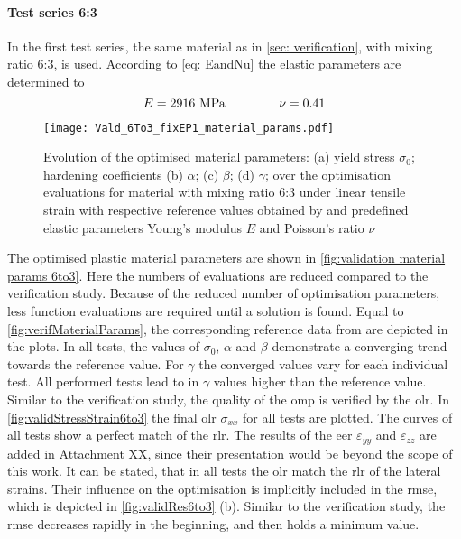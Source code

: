 \paragraph{Test series 6:3}
In the first test series, the same material as in \autoref{sec: verification}, with mixing ratio 6:3, is used. According to \autoref{eq: EandNu} the elastic parameters are determined to 
\begin{equation*}
    E = 2916 \text{MPa} \hspace{1.5cm} \nu = 0.41 
\end{equation*}

\begin{figure}[H]
    \centering
    \texttt{[image: Vald\_6To3\_fixEP1\_material\_params.pdf]}
    \caption{Evolution of the optimised material parameters: (a) yield stress $\sigma_0$; hardening coefficients (b) $\alpha$; (c) $\beta$; (d) $\gamma$; over the optimisation evaluations for material with mixing ratio 6:3 under linear tensile strain with respective reference values obtained by \citet{ries_deciphering_nodate} and predefined elastic parameters Young's modulus $E$ and Poisson's ratio $\nu$}
    \label{fig:validation material params 6to3}
\end{figure}

The optimised plastic material parameters are shown in \autoref{fig:validation material params 6to3}. Here the numbers of evaluations are reduced compared to the verification study. Because of the reduced number of optimisation parameters, less function evaluations are required until a solution is found.
Equal to \autoref{fig:verifMaterialParams}, the corresponding reference data from \citet{ries_deciphering_nodate} are depicted in the plots.
In all tests, the values of $\sigma_0$, $\alpha$ and $\beta$ demonstrate a converging trend towards the reference value.
For $\gamma$ the converged values vary for each individual test.
All performed tests lead to in $\gamma$ values higher than the reference value. Similar to the verification study, the quality of the \acrlong{omp} is verified by the \acrlong{olr}. In \autoref{fig:validStressStrain6to3} the final \acrlong{olr} $\sigma_{xx}$ for all tests are plotted. The curves of all tests show a perfect match of the \acrlong{rlr}. The results of the \acrlong{eer} $\varepsilon_{yy}$ and $\varepsilon_{zz}$ are added in Attachment XX, since their presentation would be beyond the scope of this work. It can be stated, that in all tests the \acrlong{olr} match the \acrlong{rlr} of the lateral strains. Their influence on the optimisation is implicitly included in the \acrshort{rmse}, which is depicted in \autoref{fig:validRes6to3} (b). Similar to the verification study, the \acrshort{rmse} decreases rapidly in the beginning, and then holds a minimum value.


